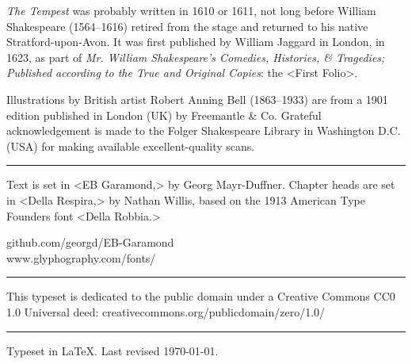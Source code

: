 \documentclass[
a5paper,
]{scrbook} %
\begin{document}
\begin{minipage}{\textwidth}
\textit{The Tempest} was probably written in 1610 or 1611, not long before William Shakespeare (1564--1616) retired from the stage and returned to his native Stratford-upon-Avon. It was first published by William Jaggard in London, in 1623, as part of \textit{Mr. William Shakespeare's Comedies, Histories, \& Tragedies; Published according to the True and Original Copies}: the <First Folio>.

Illustrations by British artist Robert Anning Bell (1863--1933) are from a 1901 edition published in London (UK) by Freemantle \& Co. Grateful acknowledgement is made to the Folger Shakespeare Library in Washington D.C. (USA) for making available excellent-quality scans.
\end{minipage}

\vfill
\rule{0.5\textwidth}{.4pt}
\vfill
\begin{minipage}{\textwidth}
Text is set in <EB Garamond,> by Georg Mayr-Duffner. Chapter heads are set in <Della Respira,> by Nathan Willis, based on the 1913 American Type Founders font <Della Robbia.>
\end{minipage}
\vfill
github.com/georgd/EB-Garamond\\www.glyphography.com/fonts/
\vfill
\rule{0.5\textwidth}{.4pt}
\vfill
\begin{minipage}{\textwidth}
This typeset is dedicated to the public domain under a Creative Commons CC0 1.0 Universal deed: creativecommons.org/publicdomain/zero/1.0/\\
\end{minipage}
\vfill
\rule{0.5\textwidth}{.4pt}
\vfill
Typeset in \LaTeX{}. Last revised \today.
\vfill
\thispagestyle{empty}
\end{document}
